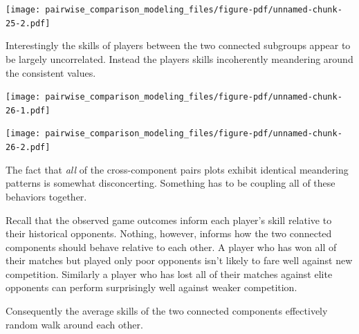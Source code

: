 \documentclass[
  letterpaper,
  DIV=11,
  numbers=noendperiod]{scrartcl}
\newenvironment{Shaded}{\begin{snugshade}}{\end{snugshade}}
\newcommand{\ControlFlowTok}[1]{\textcolor[rgb]{0.00,0.23,0.31}{#1}}
\newcommand{\DecValTok}[1]{\textcolor[rgb]{0.68,0.00,0.00}{#1}}
\newcommand{\FunctionTok}[1]{\textcolor[rgb]{0.28,0.35,0.67}{#1}}
\newcommand{\NormalTok}[1]{\textcolor[rgb]{0.00,0.23,0.31}{#1}}
\newcommand{\OtherTok}[1]{\textcolor[rgb]{0.00,0.23,0.31}{#1}}
\newcommand{\SpecialCharTok}[1]{\textcolor[rgb]{0.37,0.37,0.37}{#1}}
\newcommand{\StringTok}[1]{\textcolor[rgb]{0.13,0.47,0.30}{#1}}
\begin{document}
\texttt{[image: pairwise\_comparison\_modeling\_files/figure-pdf/unnamed-chunk-25-2.pdf]}

Interestingly the skills of players between the two connected subgroups
appear to be largely uncorrelated. Instead the players skills
incoherently meandering around the consistent values.

\begin{Shaded}
\end{Shaded}

\texttt{[image: pairwise\_comparison\_modeling\_files/figure-pdf/unnamed-chunk-26-1.pdf]}

\texttt{[image: pairwise\_comparison\_modeling\_files/figure-pdf/unnamed-chunk-26-2.pdf]}

The fact that \emph{all} of the cross-component pairs plots exhibit
identical meandering patterns is somewhat disconcerting. Something has
to be coupling all of these behaviors together.

Recall that the observed game outcomes inform each player's skill
relative to their historical opponents. Nothing, however, informs how
the two connected components should behave relative to each other. A
player who has won all of their matches but played only poor opponents
isn't likely to fare well against new competition. Similarly a player
who has lost all of their matches against elite opponents can perform
surprisingly well against weaker competition.

Consequently the average skills of the two connected components
effectively random walk around each other.
\end{document}
